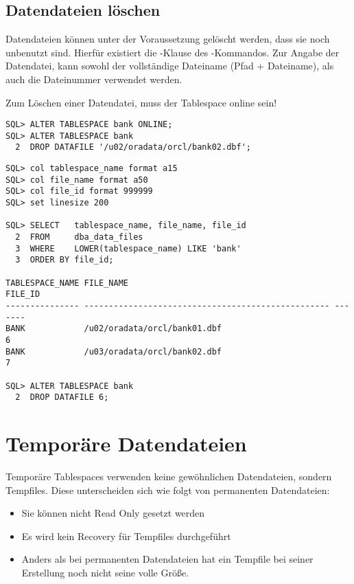       \subsection{Datendateien löschen}
        Datendateien können unter der Voraussetzung gelöscht werden, dass sie noch unbenutzt sind. Hierfür existiert die -Klause des -Kommandos. Zur Angabe der Datendatei, kann sowohl der vollständige Dateiname (Pfad + Dateiname), als auch die Dateinummer verwendet werden.
        \begin{merke}
          Zum Löschen einer Datendatei, muss der Tablespace online sein!
        \end{merke}
        \begin{lstlisting}[caption={Eine Datendatei löschen},label=admin129,language=oracle_sql]
SQL> ALTER TABLESPACE bank ONLINE;
SQL> ALTER TABLESPACE bank
  2  DROP DATAFILE '/u02/oradata/orcl/bank02.dbf';
        \end{lstlisting}
        \begin{lstlisting}[caption={Benutzen der Dateinummer zum löschen einer Datendatei},label=admin130,language=oracle_sql,alsolanguage=sqlplus]
SQL> col tablespace_name format a15
SQL> col file_name format a50
SQL> col file_id format 999999
SQL> set linesize 200

SQL> SELECT   tablespace_name, file_name, file_id
  2  FROM     dba_data_files
  3  WHERE    LOWER(tablespace_name) LIKE 'bank'
  3  ORDER BY file_id;

TABLESPACE_NAME FILE_NAME                                          FILE_ID
--------------- -------------------------------------------------- -------
BANK            /u02/oradata/orcl/bank01.dbf                             6
BANK            /u03/oradata/orcl/bank02.dbf                             7

SQL> ALTER TABLESPACE bank
  2  DROP DATAFILE 6;
        \end{lstlisting}
    \section{Temporäre Datendateien}
      Temporäre Tablespaces verwenden keine gewöhnlichen Datendateien, sondern Tempfiles. Diese unterscheiden sich wie folgt von permanenten Datendateien:
      \begin{itemize}
        \item Sie können nicht Read Only gesetzt werden
        \item Es wird kein Recovery für Tempfiles durchgeführt
        \item Anders als bei permanenten Datendateien hat ein Tempfile bei seiner Erstellung noch nicht seine volle Größe.
      \end{itemize}
